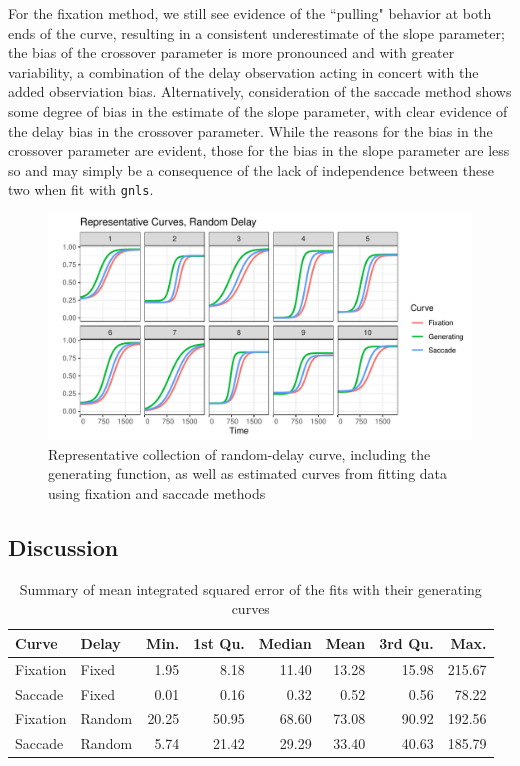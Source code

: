 \documentclass{article}
\newcommand{\xt}{\texttt}%
\begin{document}
For the fixation method, we still see evidence of the ``pulling" behavior at both ends of the curve, resulting in a consistent underestimate of the slope parameter; the bias of the crossover parameter is more pronounced and with greater variability, a combination of the delay observation acting in concert with the added observiation bias. Alternatively, consideration of the saccade method shows some degree of bias in the estimate of the slope parameter, with clear evidence of the delay bias in the crossover parameter. While the reasons for the bias in the crossover parameter are evident, those for the bias in the slope parameter are less so and may simply be a consequence of the lack of independence between these two when fit with \xt{gnls}.




\begin{figure}[H]
\centering
\includegraphics{random_pb_curves.pdf}
\caption{Representative collection of random-delay curve, including  the generating function, as well as estimated curves from fitting data using fixation and saccade methods}
\label{fig:random_pb_curves}
\end{figure}

\subsection{Discussion}

\begin{table}[ht]
\centering
\begin{tabular}{llrrrrrr}
  \hline
Curve & Delay & Min. & 1st Qu. & Median & Mean & 3rd Qu. & Max. \\ 
  \hline
Fixation & Fixed & 1.95 & 8.18 & 11.40 & 13.28 & 15.98 & 215.67 \\ 
  Saccade & Fixed & 0.01 & 0.16 & 0.32 & 0.52 & 0.56 & 78.22 \\ 
  Fixation & Random & 20.25 & 50.95 & 68.60 & 73.08 & 90.92 & 192.56 \\ 
  Saccade & Random & 5.74 & 21.42 & 29.29 & 33.40 & 40.63 & 185.79 \\ 
   \hline
\end{tabular}
\caption{Summary of mean integrated squared error of the fits with their generating curves}
\label{tab:mise_fixed_delay}
\end{table}
\end{document}

